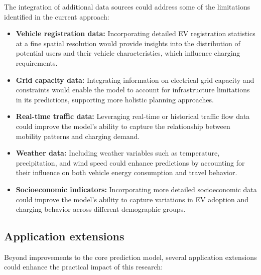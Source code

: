 The integration of additional data sources could address some of the limitations identified in the current approach:

\begin{itemize}
    \item \textbf{Vehicle registration data:} Incorporating detailed EV registration statistics at a fine spatial resolution would provide insights into the distribution of potential users and their vehicle characteristics, which influence charging requirements.

    \item \textbf{Grid capacity data:} Integrating information on electrical grid capacity and constraints would enable the model to account for infrastructure limitations in its predictions, supporting more holistic planning approaches.

    \item \textbf{Real-time traffic data:} Leveraging real-time or historical traffic flow data could improve the model's ability to capture the relationship between mobility patterns and charging demand.

    \item \textbf{Weather data:} Including weather variables such as temperature, precipitation, and wind speed could enhance predictions by accounting for their influence on both vehicle energy consumption and travel behavior.

    \item \textbf{Socioeconomic indicators:} Incorporating more detailed socioeconomic data could improve the model's ability to capture variations in EV adoption and charging behavior across different demographic groups.
\end{itemize}

\subsection{Application extensions}

Beyond improvements to the core prediction model, several application extensions could enhance the practical impact of this research:

